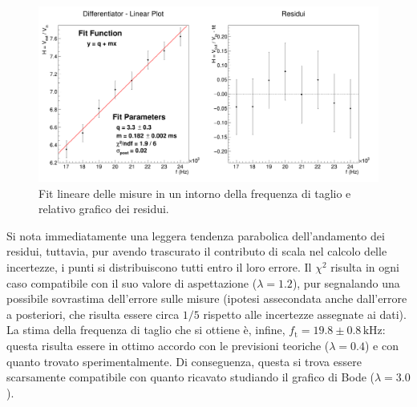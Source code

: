 \documentclass[a4paper,11pt]{article} %
\begin{document}
\begin{figure}[H]
	\centering
	\includegraphics[width=\linewidth]{../Plots/Report_Plots/diff_linear.png}
	\caption{\small Fit lineare delle misure in un intorno della frequenza di taglio e relativo grafico dei residui.}
	\label{i:diff_linear}
\end{figure}
\noindent Si nota immediatamente una leggera tendenza parabolica dell'andamento dei residui, tuttavia, pur avendo
trascurato il contributo di scala nel calcolo delle incertezze, i punti si distribuiscono tutti entro il loro errore. Il
$\chi^2$ risulta in ogni caso compatibile con il suo valore di aspettazione ($\lambda = 1.2$), pur segnalando una
possibile sovrastima dell'errore sulle misure (ipotesi assecondata anche dall'errore a posteriori, che risulta essere
circa $1/5$ rispetto alle incertezze assegnate ai dati). La stima della frequenza di taglio che si ottiene è, infine,
$f_{\text{t}} = 19.8\pm 0.8\,\si{\kHz}$: questa risulta essere in ottimo accordo con le previsioni teoriche
($\lambda=0.4$) e con quanto trovato sperimentalmente. Di conseguenza, questa si trova essere scarsamente compatibile
con quanto ricavato studiando il grafico di Bode ($\lambda = 3.0$).


\end{document}
